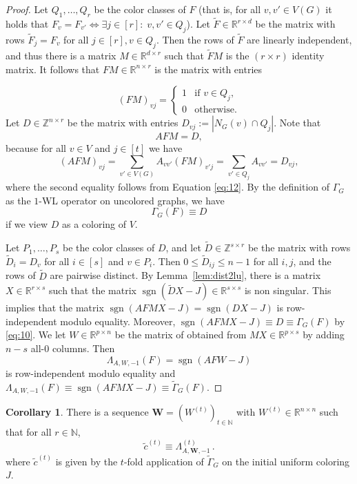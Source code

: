 \documentclass[letterpaper]{article}
\theoremstyle{definition}
\newtheorem{corollary}[theorem]{Corollary}
\newcommand{\RR}{\mathbb{R}}
\newcommand{\ZZ}{\mathbb{Z}}
\newcommand{\NN}{\mathbb{N}}
\renewcommand{\vec}[1]{\mathbf{#1}}
\newcommand{\sgn}{\operatorname{sgn}}
\begin{document}
\begin{proof}
	Let $Q_1,\ldots,Q_r$ be the color
	classes of $F$ (that is, for all $v,v'\in V(G)$ it holds that
	$F_{v}=F_{v'}\iff\exists j\in[r]:\; v,v'\in Q_j$). Let
	$\tilde F\in\RR^{r\times d}$ be the matrix with rows $\tilde
	F_{j}=F_{v}$ for all $j\in[r], v\in Q_j$. Then the rows of $\tilde
	F$ are linearly independent, and thus there is a matrix 
	$M\in\RR^{d\times r}$ such that $\tilde FM$ is the $(r\times r)$ identity
	matrix. 
	It follows that $FM\in\RR^{n\times r}$ is the matrix with entries
		
	\begin{equation}
		\label{eq:12}
		(FM)_{vj}=
		\begin{cases}
			1 & \text{if }v\in Q_j, \\
			0 & \text{otherwise}.   
		\end{cases}
	\end{equation}
	Let $D\in\ZZ^{n\times r}$ be
	the matrix with entries $D_{vj}:=|N_G(v)\cap Q_j|$. Note that
	\begin{equation}
		\label{eq:13}
		AFM=D,
	\end{equation}
	because for all $v\in V$ and $j\in[t]$ we have
	\[
		(AFM)_{vj}=\sum_{v'\in V(G)}A_{vv'}(FM)_{v'j}
		= \sum_{v'\in Q_j}A_{vv'}=D_{vj},
	\]
	where the second equality follows from Equation \eqref{eq:12}. By the definition of $\Gamma_G$ as the $1$-WL operator on uncolored graphs, we have
	\begin{equation}
		\label{eq:10}
		\Gamma_G(F)\equiv D
	\end{equation}
	if we view $D$ as a coloring of $V$.
				
	Let $P_1,\ldots,P_s$ be the color classes of $D$, and let $\tilde D\in\ZZ^{s\times r}$ be the matrix
	with rows $\tilde D_{i}=D_{v}$ for all $i\in[s]$ and $v\in
	P_i$. Then $0\le\tilde D_{ij}\le n-1$ for all $i,j$, and the rows of
	$\tilde D$ are pairwise distinct. By Lemma~\ref{lem:dist2lu}, there is a
	matrix $X\in\RR^{r\times s}$ such that the matrix
	$\sgn(\tilde DX-J)\in\RR^{s\times s}$ is non singular. This implies
	that the matrix $\sgn(AFMX-J)=\sgn(DX-J)$ is row-independent modulo
	equality. Moreover, $\sgn(AFMX-J)\equiv D\equiv \Gamma_G(F)$ by \eqref{eq:10}. We let $W\in\RR^{p\times n}$ be the matrix of obtained from
	$MX\in\RR^{p\times s}$ by adding $n-s$ all-0 columns. Then 
	\[
		\Lambda_{A,W,-1}(F)=\sgn(AFW-J)
	\]
	is row-independent modulo equality and
	$\Lambda_{A,W,-1}(F)\equiv\sgn(AFMX-J)\equiv \tilde\Gamma_G(F)$. 
\end{proof}
\begin{corollary}
	There is a sequence $\vec W=(W^{(t)})_{t\in\NN}$ with
	$W^{(t)}\in \RR^{n\times n}$ such that for all $r\in\NN$,
	\[
		\tilde c^{(t)}\equiv \Lambda_{A,\vec W,-1}^{(t)}\,.
	\]
	where $\tilde c^{(t)}$ is given by the $t$-fold application of $\tilde\Gamma_G$ on the initial uniform coloring $J$.
\end{corollary}
\end{document}
